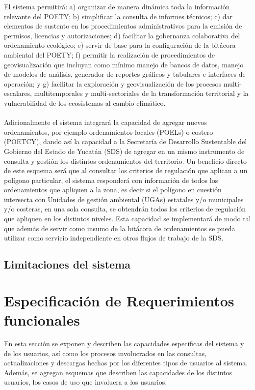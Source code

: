 El sistema permitirá: a) organizar de manera dinámica toda la información relevante del POETY; b) simplificar la consulta de informes técnicos; c) dar elementos de sustento en los procedimientos administrativos para la emisión de permisos, licencias y autorizaciones; d) facilitar la gobernanza colaborativa del ordenamiento ecológico; e) servir de base para la configuración de la bitácora ambiental del POETY; f) permitir la realización de procedimientos de geovisualización que incluyan como mínimo manejo de bancos de datos, manejo de modelos de análisis, generador de reportes gráficos y tabulares e interfaces de operación; y g) facilitar la exploración y geovisualización de los procesos multi-escalares, multitemporales y multi-sectoriales de la transformación territorial y la vulnerabilidad de los ecosistemas al cambio climático.
\\
\\
Adicionalmente el sistema integrará la capacidad de agregar nuevos ordenamientos, por ejemplo ordenamientos locales (POELs) o costero (POETCY), dando así la capacidad a la Secretaría de Desarrollo Sustentable del Gobierno del Estado de Yucatán (SDS) de agregar en un mismo instrumento de consulta y gestión los distintos ordenamientos del territorio. Un beneficio directo de este esquema será que al consultar los criterios de regulación que aplican a un polígono particular, el sistema responderá con información de todos los ordenamientos que apliquen a la zona, es decir si el polígono en cuestión intersecta con Unidades de gestión ambiental (UGAs) estatales y/o municipales y/o costeras, en una sola consulta, se obtendrán todos los criterios de regulación que apliquen en los distintos niveles. Esta capacidad se implementará de modo tal que además de servir como insumo de la bitácora de ordenamientos se pueda utilizar como servicio independiente en otros flujos de trabajo de la SDS.


\subsection{Limitaciones del sistema}


\section{Especificación de Requerimientos funcionales}
En esta sección se exponen y describen las capacidades específicas del sistema y de los usuarios, así como los procesos involucrados en las consultas, actualizaciones y descargas hechas por los diferentes tipos de usuarios al sistema. Además, se agregan esquemas que describen las capacidades de los distintos usuarios, los casos de uso que involucra a los usuarios.
\\
\\

